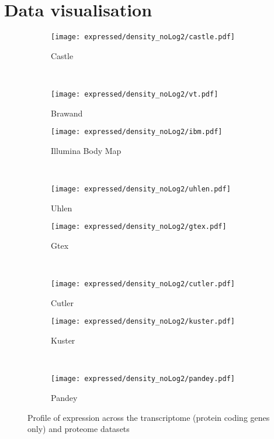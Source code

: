 \section{Data visualisation}
\begin{figure}[!ht]
    \centering
    \begin{subfigure}[b]{0.35\textwidth}
        \centering \texttt{[image: expressed/density\_noLog2/castle.pdf]}
        \caption{Castle}\label{fig:densityCastle_nolog2}
    \end{subfigure}%
~%
    \begin{subfigure}[b]{0.35\textwidth}
        \centering \texttt{[image: expressed/density\_noLog2/vt.pdf]}
        \caption{Brawand}\label{fig:densityBrawand_nolog2}
    \end{subfigure}

    \begin{subfigure}[b]{0.35\textwidth}
        \centering \texttt{[image: expressed/density\_noLog2/ibm.pdf]}
        \caption{Illumina Body Map}\label{fig:densityIBM_nolog2}
    \end{subfigure}%
~%
    \begin{subfigure}[b]{0.35\textwidth}
        \centering \texttt{[image: expressed/density\_noLog2/uhlen.pdf]}
        \caption{Uhlen}\label{fig:densityUhlen_nolog2}
    \end{subfigure}

    \begin{subfigure}[b]{0.35\textwidth}
        \centering \texttt{[image: expressed/density\_noLog2/gtex.pdf]}
        \caption{Gtex}\label{fig:densityGtex_nolog2}
    \end{subfigure}%
~%
    \begin{subfigure}[b]{0.35\textwidth}
        \centering \texttt{[image: expressed/density\_noLog2/cutler.pdf]}
        \caption{Cutler}\label{fig:densityCutler_nolog2}
    \end{subfigure}

    \begin{subfigure}[b]{0.35\textwidth}
        \centering \texttt{[image: expressed/density\_noLog2/kuster.pdf]}
        \caption{Kuster}\label{fig:densityKuster_nolog2}
    \end{subfigure}%
~%
    \begin{subfigure}[b]{0.35\textwidth}
        \centering \texttt{[image: expressed/density\_noLog2/pandey.pdf]}
        \caption{Pandey}\label{fig:densityPandey_nolog2}
    \end{subfigure}
    \caption{Profile of expression across the transcriptome (protein coding
    genes only) and proteome datasets}\label{fig:distribPlot_noLog2}
\end{figure}

